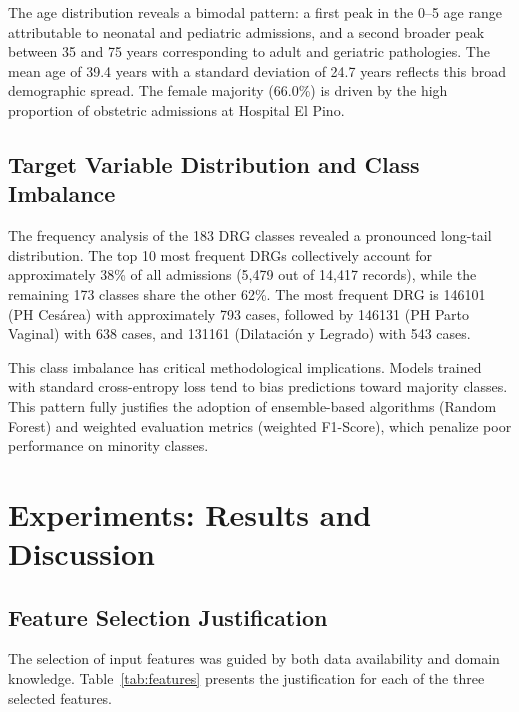 \documentclass{IEEEtran}
\begin{document}
The age distribution reveals a bimodal pattern: a first peak in the 0--5 age range attributable to neonatal and pediatric admissions, and a second broader peak between 35 and 75 years corresponding to adult and geriatric pathologies. The mean age of 39.4 years with a standard deviation of 24.7 years reflects this broad demographic spread. The female majority (66.0\%) is driven by the high proportion of obstetric admissions at Hospital El Pino.

\subsection{Target Variable Distribution and Class Imbalance}
The frequency analysis of the 183 DRG classes revealed a pronounced long-tail distribution. The top 10 most frequent DRGs collectively account for approximately 38\% of all admissions (5,479 out of 14,417 records), while the remaining 173 classes share the other 62\%. The most frequent DRG is 146101 (PH Ces\'area) with approximately 793 cases, followed by 146131 (PH Parto Vaginal) with 638 cases, and 131161 (Dilataci\'on y Legrado) with 543 cases.

This class imbalance has critical methodological implications. Models trained with standard cross-entropy loss tend to bias predictions toward majority classes. This pattern fully justifies the adoption of ensemble-based algorithms (Random Forest) and weighted evaluation metrics (weighted F1-Score), which penalize poor performance on minority classes.

\section{Experiments: Results and Discussion}

\subsection{Feature Selection Justification}
The selection of input features was guided by both data availability and domain knowledge. Table~\ref{tab:features} presents the justification for each of the three selected features.
\end{document}
